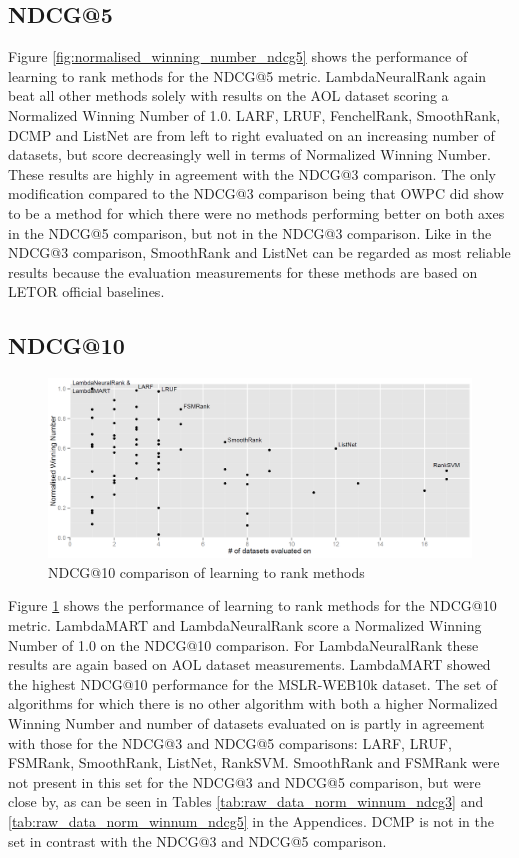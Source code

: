 \documentclass{sig-alternate-2013}
\begin{document}
\subsection{NDCG@5}
Figure \ref{fig:normalised_winning_number_ndcg5} shows the performance of learning to rank methods for the NDCG@5 metric. LambdaNeuralRank again beat all other methods solely with results on the AOL dataset scoring a Normalized Winning Number of 1.0. LARF, LRUF, FenchelRank, SmoothRank, DCMP and ListNet are from left to right evaluated on an increasing number of datasets, but score decreasingly well in terms of Normalized Winning Number. These results are highly in agreement with the NDCG@3 comparison. The only modification compared to the NDCG@3 comparison being that OWPC did show to be a method for which there were no methods performing better on both axes in the NDCG@5 comparison, but not in the NDCG@3 comparison. Like in the NDCG@3 comparison, SmoothRank and ListNet can be regarded as most reliable results because the evaluation measurements for these methods are based on LETOR official baselines.

\subsection{NDCG@10}
\begin{figure}
\includegraphics[scale=0.371]{gfx/ndcg10_winnum}
\caption{NDCG@10 comparison of learning to rank methods}
\label{fig:normalised_winning_number_ndcg10}
\end{figure}

Figure \ref{fig:normalised_winning_number_ndcg10} shows the performance of learning to rank methods for the NDCG@10 metric. LambdaMART and LambdaNeuralRank score a Normalized Winning Number of 1.0 on the NDCG@10 comparison. For LambdaNeuralRank these results are again based on AOL dataset measurements. LambdaMART showed the highest NDCG@10 performance for the MSLR-WEB10k dataset. The set of algorithms for which there is no other algorithm with both a higher Normalized Winning Number and number of datasets evaluated on is partly in agreement with those for the NDCG@3 and NDCG@5 comparisons: {LARF, LRUF, FSMRank, SmoothRank, ListNet, RankSVM}. SmoothRank and FSMRank were not present in this set for the NDCG@3 and NDCG@5 comparison, but were close by, as can be seen in Tables \ref{tab:raw_data_norm_winnum_ndcg3} and \ref{tab:raw_data_norm_winnum_ndcg5} in the Appendices. DCMP is not in the set in contrast with the NDCG@3 and NDCG@5 comparison.
\end{document}
